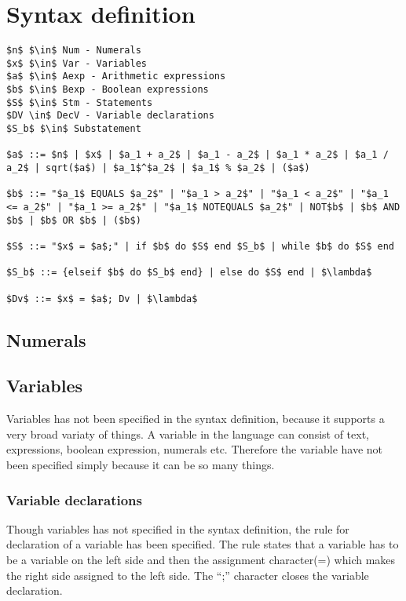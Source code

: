 \section{Syntax definition}\label{sec:anlysis:syntax-definition}
\begin{lstlisting}[mathescape, captionpos=b, caption={Syntax formation rules}, label={lst:syntax-formation}]
$n$ $\in$ Num - Numerals
$x$ $\in$ Var - Variables
$a$ $\in$ Aexp - Arithmetic expressions
$b$ $\in$ Bexp - Boolean expressions
$S$ $\in$ Stm - Statements
$DV \in$ DecV - Variable declarations
$S_b$ $\in$ Substatement

$a$ ::= $n$ | $x$ | $a_1 + a_2$ | $a_1 - a_2$ | $a_1 * a_2$ | $a_1 / a_2$ | sqrt($a$) | $a_1$^$a_2$ | $a_1$ % $a_2$ | ($a$)

$b$ ::= "$a_1$ EQUALS $a_2$" | "$a_1 > a_2$" | "$a_1 < a_2$" | "$a_1 <= a_2$" | "$a_1 >= a_2$" | "$a_1$ NOTEQUALS $a_2$" | NOT$b$ | $b$ AND $b$ | $b$ OR $b$ | ($b$)

$S$ ::= "$x$ = $a$;" | if $b$ do $S$ end $S_b$ | while $b$ do $S$ end

$S_b$ ::= {elseif $b$ do $S_b$ end} | else do $S$ end | $\lambda$

$Dv$ ::= $x$ = $a$; Dv | $\lambda$
\end{lstlisting}

\subsection{Numerals}
\subsection{Variables}
Variables has not been specified in the syntax definition, because it supports a very broad variaty of things. A variable in the language can consist of text, expressions, boolean expression, numerals etc. Therefore the variable have not been specified simply because it can be so many things.

\subsubsection{Variable declarations}\label{sec:analysis:syntax-definition:variable-declaration}
Though variables has not specified in the syntax definition, the rule for declaration of a variable has been specified. The rule states that a variable has to be a variable on the left side and then the assignment character(=) which makes the right side assigned to the left side. The ``;'' character closes the variable declaration.

